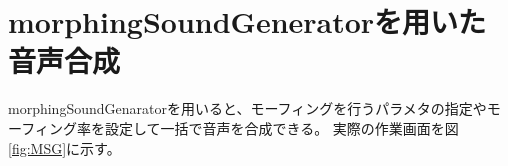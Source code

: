 
\clearpage

\section{morphingSoundGeneratorを用いた音声合成}
\label{sec:morphingSoundGenarator}
morphingSoundGenaratorを用いると、モーフィングを行うパラメタの指定やモーフィング率を設定して一括で音声を合成できる。
実際の作業画面を図\ref{fig:MSG}に示す。

